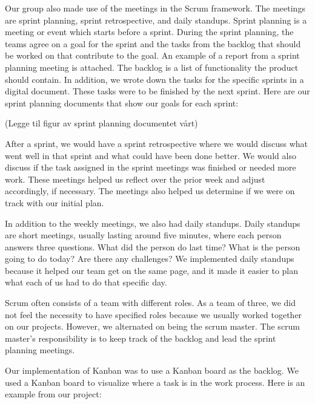 Our group also made use of the meetings in the Scrum framework. The meetings are sprint planning, sprint retrospective, and daily standups. Sprint planning is a meeting or event which starts before a sprint. During the sprint planning, the teams agree on a goal for the sprint and the tasks from the backlog that should be worked on that contribute to the goal. An example of a report from a sprint planning meeting is attached. The backlog is a list of functionality the product should contain. In addition, we wrote down the tasks for the specific sprints in a digital document. These tasks were to be finished by the next sprint. Here are our sprint planning documents that show our goals for each sprint:

(Legge til figur av sprint planning documentet vårt)

After a sprint, we would have a sprint retrospective where we would discuss what went well in that sprint and what could have been done better. We would also discuss if the task assigned in the sprint meetings was finished or needed more work. These meetings helped us reflect over the prior week and adjust accordingly, if necessary. The meetings also helped us determine if we were on track with our initial plan. 
 
In addition to the weekly meetings, we also had daily standups. Daily standups are short meetings, usually lasting around five minutes, where each person answers three questions. What did the person do last time? What is the person going to do today? Are there any challenges? We implemented daily standups because it helped our team get on the same page, and it made it easier to plan what each of us had to do that specific day.

Scrum often consists of a team with different roles. As a team of three, we did not feel the necessity to have specified roles because we usually worked together on our projects. However, we alternated on being the scrum master. The scrum master's responsibility is to keep track of the backlog and lead the sprint planning meetings.

Our implementation of Kanban was to use a Kanban board as the backlog. We used a Kanban board to visualize where a task is in the work process. Here is an example from our project:

